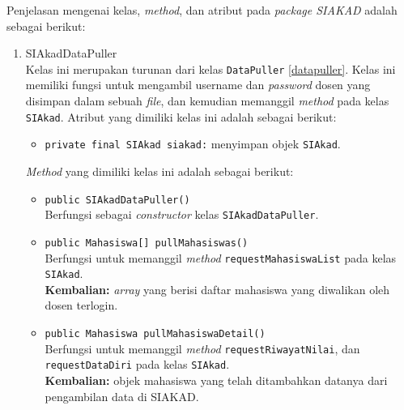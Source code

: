 Penjelasan mengenai kelas, \textit{method}, dan atribut pada \textit{package SIAKAD} adalah sebagai berikut:
\begin{enumerate}

\item{SIAkadDataPuller}\\
	Kelas ini merupakan turunan dari kelas \texttt{DataPuller} \ref{datapuller}. Kelas ini memiliki fungsi untuk mengambil username dan \textit{password} dosen yang disimpan dalam sebuah \textit{file}, dan kemudian memanggil \textit{method} pada kelas \texttt{SIAkad}. Atribut yang dimiliki kelas ini adalah sebagai berikut:
	\begin{itemize}
        \item \texttt{private final SIAkad siakad:} menyimpan objek \texttt{SIAkad}.
	\end{itemize}
	
	\textit{Method} yang dimiliki kelas ini adalah sebagai berikut:
	\begin{itemize}
		\item \texttt{public SIAkadDataPuller()}\\
		Berfungsi sebagai \textit{constructor} kelas \texttt{SIAkadDataPuller}.
		
		\item \texttt{public Mahasiswa[] pullMahasiswas()}\\
	    Berfungsi untuk memanggil \textit{method} \texttt{requestMahasiswaList} pada kelas \texttt{SIAkad}.\\
		\textbf{Kembalian:} \textit{array} yang berisi daftar mahasiswa yang diwalikan oleh dosen terlogin.
		
		\item \texttt{public Mahasiswa pullMahasiswaDetail()}\\
	    Berfungsi untuk memanggil \textit{method} \texttt{requestRiwayatNilai}, dan \texttt{requestDataDiri} pada kelas \texttt{SIAkad}.\\
		\textbf{Kembalian:} objek mahasiswa yang telah ditambahkan datanya dari pengambilan data di SIAKAD.
	\end{itemize}
	

\end{enumerate}

